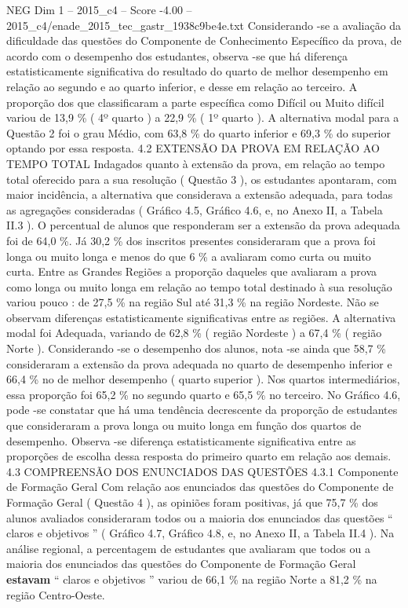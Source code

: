 \begin{textsample}{NEG Dim 1 – 2015\_c4 – Score -4.00 – 2015\_c4/enade\_2015\_tec\_gastr\_1938c9be4e.txt}
Considerando -se a avaliação da dificuldade das questões do Componente de Conhecimento Específico da prova, de acordo com o desempenho dos estudantes, observa -se que há diferença estatisticamente significativa do resultado do quarto de melhor desempenho em relação ao segundo e ao quarto inferior, e desse em relação ao terceiro.
A proporção dos que classificaram a parte específica como Difícil ou Muito difícil variou de 13,9 \% ( 4º quarto ) a 22,9 \% ( 1º quarto ).
A alternativa modal para a Questão 2 foi o grau Médio, com 63,8 \% do quarto inferior e 69,3 \% do superior optando por essa resposta. 4.2 EXTENSÃO DA PROVA EM RELAÇÃO AO TEMPO TOTAL Indagados quanto à extensão da prova, em relação ao tempo total oferecido para a sua resolução ( Questão 3 ), os estudantes apontaram, com maior incidência, a alternativa que considerava a extensão adequada, para todas as agregações consideradas ( Gráfico 4.5, Gráfico 4.6, e, no Anexo II, a Tabela II.3 ).
O percentual de alunos que responderam ser a extensão da prova adequada foi de 64,0 \%.
Já 30,2 \% dos inscritos presentes consideraram que a prova foi longa ou muito longa e menos do que 6 \% a avaliaram como curta ou muito curta.
Entre as Grandes Regiões a proporção daqueles que avaliaram a prova como longa ou muito longa em relação ao tempo total destinado à sua resolução variou pouco : de 27,5 \% na região Sul até 31,3 \% na região Nordeste.
Não se observam diferenças estatisticamente significativas entre as regiões.
A alternativa modal foi Adequada, variando de 62,8 \% ( região Nordeste ) a 67,4 \% ( região Norte ).
Considerando -se o desempenho dos alunos, nota -se ainda que 58,7 \% consideraram a extensão da prova adequada no quarto de desempenho inferior e 66,4 \% no de melhor desempenho ( quarto superior ).
Nos quartos intermediários, essa proporção foi 65,2 \% no segundo quarto e 65,5 \% no terceiro.
No Gráfico 4.6, pode -se constatar que há uma tendência decrescente da proporção de estudantes que consideraram a prova longa ou muito longa em função dos quartos de desempenho.
Observa -se diferença estatisticamente significativa entre as proporções de escolha dessa resposta do primeiro quarto em relação aos demais. 4.3 COMPREENSÃO DOS ENUNCIADOS DAS QUESTÕES 4.3.1 Componente de Formação Geral Com relação aos enunciados das questões do Componente de Formação Geral ( Questão 4 ), as opiniões foram positivas, já que 75,7 \% dos alunos avaliados consideraram todos ou a maioria dos enunciados das questões “ claros e objetivos ” ( Gráfico 4.7, Gráfico 4.8, e, no Anexo II, a Tabela II.4 ).
Na análise regional, a percentagem de estudantes que avaliaram que todos ou a maioria dos enunciados das questões do Componente de Formação Geral \textbf{estavam} “ claros e objetivos ” variou de 66,1 \% na região Norte a 81,2 \% na região Centro-Oeste.

\end{textsample}
